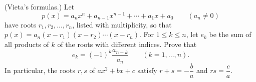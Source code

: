 (Vieta's formulas.) Let
\[p(x)=a_nx^n+a_{n-1}x^{n-1}+\cdots+a_1x+a_0\qquad(a_n\ne0)\]
have roots $r_1,r_2,\dots,r_n$, listed with multiplicity, so that $p(x)=a_n(x-r_1)(x-r_2)\cdots(x-r_n)$. For $1\le k\le n$, let $e_k$ be the sum of all products of $k$ of the roots with different indices. Prove that
\[e_k=(-1)^k\dfrac{a_{n-k}}{a_n}\qquad(k=1,\dots,n).\]
In particular, the roots $r,s$ of $ax^2+bx+c$ satisfy $r+s=-\dfrac ba$ and $rs=\dfrac ca$.
